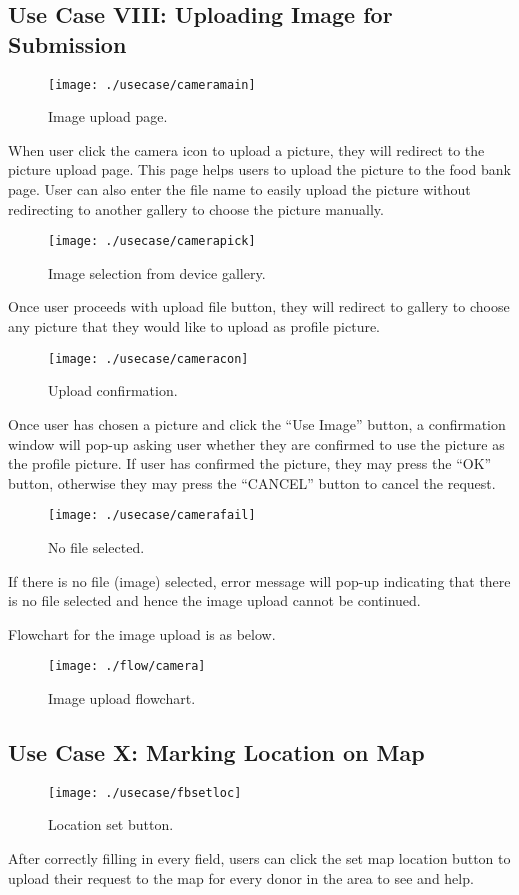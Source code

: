 \documentclass[conference]{IEEEtran}
\begin{document}
\subsection{Use Case VIII: Uploading Image for Submission}
\begin{figure}[h!]
\texttt{[image: ./usecase/cameramain]}
\centering
\caption{Image upload page.}
\end{figure}
\par When user click the camera icon to upload a picture, they will redirect to the picture upload page. This page helps users to upload the picture to the food bank page. User can also enter the file name to easily upload the picture without redirecting to another gallery to choose the picture manually. 
\begin{figure}[h!]
\texttt{[image: ./usecase/camerapick]}
\centering
\caption{Image selection from device gallery.}
\end{figure}
\par Once user proceeds with upload file button, they will redirect to gallery to choose any picture that they would like to upload as profile picture.
\begin{figure}[h!]
\texttt{[image: ./usecase/cameracon]}
\centering
\caption{Upload confirmation.}
\end{figure}
\par Once user has chosen a picture and click the “Use Image” button, a confirmation window will pop-up asking user whether they are confirmed to use the picture as the profile picture. If user has confirmed the picture, they may press the “OK” button, otherwise they may press the “CANCEL” button to cancel the request.
\begin{figure}[h!]
\texttt{[image: ./usecase/camerafail]}
\centering
\caption{No file selected.}
\end{figure}
\par If there is no file (image) selected, error message will pop-up indicating that there is no file selected and hence the image upload cannot be continued. \break

Flowchart for the image upload is as below.
\begin{figure}[h!]
\texttt{[image: ./flow/camera]}
\centering
\caption{Image upload flowchart.}
\end{figure}

\subsection{Use Case X: Marking Location on Map}
\begin{figure}[h!]
\texttt{[image: ./usecase/fbsetloc]}
\centering
\caption{Location set button.}
\end{figure}
After correctly filling in every field, users can click the set map location button to upload their request to the map for every donor in the area to see and help.
\end{document}
